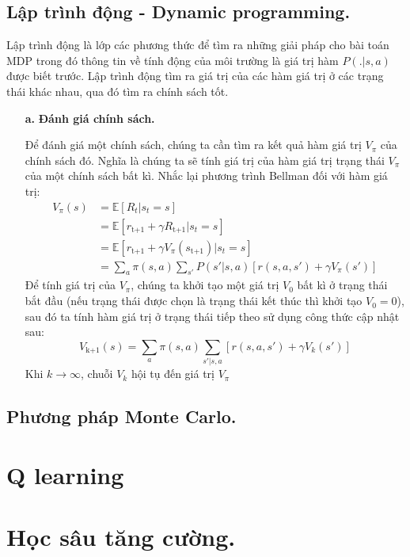 \documentclass{uetgraduation}
\begin{document}
\subsection{Lập trình động - Dynamic programming.}
Lập trình động là lớp các phương thức để tìm ra những giải pháp cho bài toán MDP trong đó thông tin về tính động của môi trường là giá trị hàm $P(.|s, a)$ được biết trước. Lập trình động tìm ra
giá trị của các hàm giá trị ở các trạng thái khác nhau, qua đó tìm ra chính sách tốt.

\begin{itemize}
    \item[\textbf{a.}] \textbf{Đánh giá chính sách.}
    
    Để đánh giá một chính sách, chúng ta cần tìm ra kết quả hàm giá trị $V_\pi$ của chính sách đó. Nghĩa là chúng ta sẽ tính giá trị của hàm giá trị trạng thái $V_\pi$ của một chính sách bất kì.
    Nhắc lại phương trình Bellman đối với hàm giá trị:
    \begin{align*}
        V_\pi (s) &= \mathbb{E} [R_t | s_t = s] \\
        &= \mathbb{E} [r_\text{t+1} + \gamma R_\text{t+1} | s_t = s] \\
        &= \mathbb{E} [r_\text{t+1} + \gamma V_\pi (s_\text{t+1}) | s_t = s] \\
        &= \sum_{a} \pi(s, a) \sum_{s'} P(s' | s, a) [r(s, a, s') + \gamma V_\pi (s')]
    \end{align*}
    Để tính giá trị của $V_\pi$, chúng ta khởi tạo một giá trị $V_0$ bất kì ở trạng thái bắt đầu (nếu trạng thái được chọn là trạng thái kết thúc thì khởi tạo $V_0 = 0$), sau đó ta tính hàm giá trị
    ở trạng thái tiếp theo sử dụng công thức cập nhật sau:
    \[
    V_\text{k+1} (s) = \sum_{a} \pi (s, a) \sum_{s' | s, a} [r(s, a, s') + \gamma V_k (s')]
    \]
    Khi $k \to \infty$, chuỗi $V_k$ hội tụ đến giá trị $V_\pi$

    \item[] 
\end{itemize}

\subsection{Phương pháp Monte Carlo.}

\section{Q learning}

\section{Học sâu tăng cường.}
\end{document}
